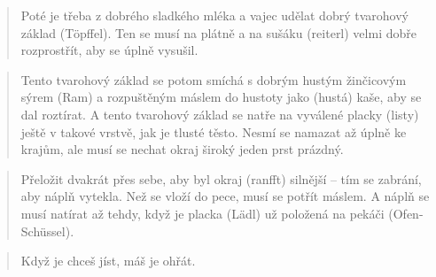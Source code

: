 \begin{quote}
Poté je třeba z dobrého sladkého mléka a vajec udělat dobrý tvarohový
základ (Töpffel). Ten se musí na plátně a na sušáku (reiterl) velmi
dobře rozprostřít, aby se úplně vysušil.
\end{quote}

\begin{quote}
Tento tvarohový základ se potom smíchá s dobrým hustým žinčicovým sýrem
(Ram) a rozpuštěným máslem do hustoty jako (hustá) kaše, aby se dal
roztírat. A tento tvarohový základ se natře na vyválené placky (listy)
ještě v takové vrstvě, jak je tlusté těsto. Nesmí se namazat až úplně ke
krajům, ale musí se nechat okraj široký jeden prst prázdný.
\end{quote}

\begin{quote}
Přeložit dvakrát přes sebe, aby byl okraj (ranfft) silnější -- tím se
zabrání, aby náplň vytekla. Než se vloží do pece, musí se potřít máslem.
A náplň se musí natírat až tehdy, když je placka (Lädl) už položená na
pekáči (Ofen-Schüssel).
\end{quote}

\begin{quote}
Když je chceš jíst, máš je ohřát.
\end{quote}

